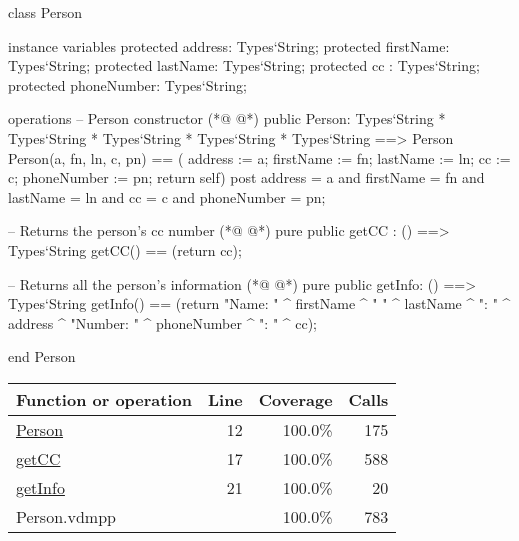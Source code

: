 \begin{vdmpp}[breaklines=true]
class Person

instance variables
  protected address: Types`String;
  protected firstName: Types`String;
  protected lastName: Types`String;
  protected cc : Types`String;
  protected phoneNumber: Types`String;
  
operations
 -- Person constructor
(*@
\label{Person:12}
@*)
 public Person: Types`String * Types`String * Types`String * Types`String * Types`String ==> Person
  Person(a, fn, ln, c, pn) == ( address := a; firstName := fn; lastName := ln; cc := c; phoneNumber := pn; return self)
 post address = a and firstName = fn and lastName = ln and cc = c and phoneNumber = pn;
 
 -- Returns the person's cc number
(*@
\label{getCC:17}
@*)
 pure public getCC : () ==> Types`String
  getCC() == (return cc);
 
 -- Returns all the person's information
(*@
\label{getInfo:21}
@*)
 pure public getInfo: () ==> Types`String
  getInfo() == (return "Name: " ^ firstName ^ " " ^ lastName ^ "\nAddress: " ^ address ^ "\nPhone Number: " ^ phoneNumber ^ "\nCC: " ^ cc);

end Person
\end{vdmpp}
\bigskip
\begin{longtable}{|l|r|r|r|}
\hline
Function or operation & Line & Coverage & Calls \\
\hline
\hline
\hyperref[Person:12]{Person} & 12&100.0\% & 175 \\
\hline
\hyperref[getCC:17]{getCC} & 17&100.0\% & 588 \\
\hline
\hyperref[getInfo:21]{getInfo} & 21&100.0\% & 20 \\
\hline
\hline
Person.vdmpp & & 100.0\% & 783 \\
\hline
\end{longtable}


